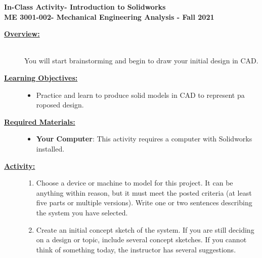 \documentclass[12pt]{article}
\newcommand{\COURNAME}{ME 3001-002}
\newcommand{\CURRTERM}{Fall 2021} %
\newcommand{\ANUM}{2} %
\newcommand{\activitytitle}{Introduction to Solidworks} %
\begin{document}
\thispagestyle{plain}

\begin{center}
   {\bf \Large In-Class Activity\hspc\ANUM\hspc - \activitytitle}\vspace{3mm}\\
   {\bf \large \COURNAME - Mechanical Engineering Analysis - \CURRTERM} \vspace{5mm}\\
\end{center}

\begin{description}

\item[\textbf{\underline{Overview:}}] \hfill \vspace{3mm}\\
You will start brainstorming and begin to draw your initial design in CAD.

\item[\textbf{\underline{Learning Objectives:}}] \hfill \vspace{0mm}

\begin{itemize}
	\item Practice and learn to produce solid models in CAD to represent pa roposed design. 
\end{itemize}

\item[\textbf{\underline{Required Materials:}}] \hfill \vspace{0mm}

\begin{itemize}
	\item {\bf Your Computer}: This activity requires a computer with Solidworks installed.
\end{itemize}

\item[\textbf{\underline{Activity:}}] \hfill \vspace{0mm}

\begin{enumerate}
	

	\item Choose a device or machine to model for this project. It can be anything within reason, but it must meet the posted criteria (at least five parts or multiple versions). Write one or two sentences describing the system you have selected.
	
	\item Create an initial concept sketch of the system. If you are still deciding on a design or topic, include several concept sketches. If you cannot think of something today, the instructor has several suggestions.
	

\end{enumerate}
\end{description}
\end{document}
